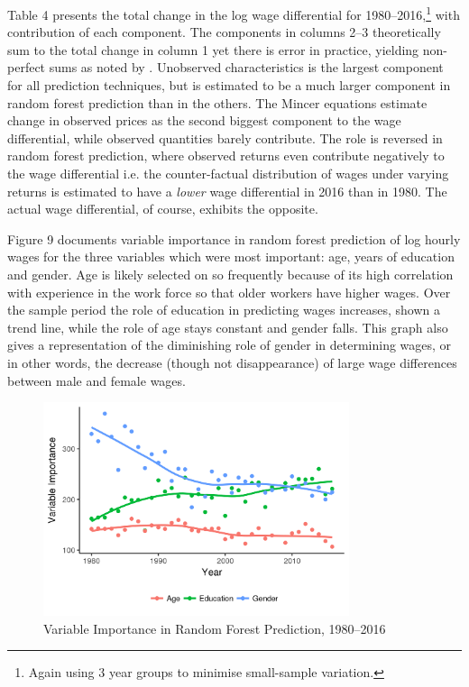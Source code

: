 \documentclass[notitlepage,12pt]{article}
\begin{document}
Table 4 presents the total change in the log wage differential for 1980--2016,\footnote{Again using 3 year groups to minimise small-sample variation.} with contribution of each component.  The components in columns 2--3 theoretically sum to the total change in column 1 yet there is error in practice, yielding non-perfect sums as noted by \cite{autor200914}.  Unobserved characteristics is the largest component for all prediction techniques, but is estimated to be a much larger component in random forest prediction than in the others.  The Mincer equations estimate change in observed prices as the second biggest component to the wage differential, while observed quantities barely contribute.  The role is reversed in random forest prediction, where observed returns even contribute negatively to the wage differential i.e. the counter-factual distribution of wages under varying returns is estimated to have a \textit{lower} wage differential in 2016 than in 1980.  The actual wage differential, of course, exhibits the opposite.

Figure 9 documents variable importance in random forest prediction of log hourly wages for the three variables which were most important: age, years of education and gender.  Age is likely selected on so frequently because of its high correlation with experience in the work force so that older workers have higher wages.  Over the sample period the role of education in predicting wages increases, shown a trend line, while the role of age stays constant and gender falls.  This graph also gives a representation of the diminishing role of gender in determining wages, or in other words, the decrease (though not disappearance) of large wage differences between male and female wages.
\begin{figure}[H]
  \centering
  \includegraphics[width=0.8\textwidth]{importance_graph.png}
  \caption{Variable Importance in Random Forest Prediction, 1980--2016}
\end{figure}
\end{document}

